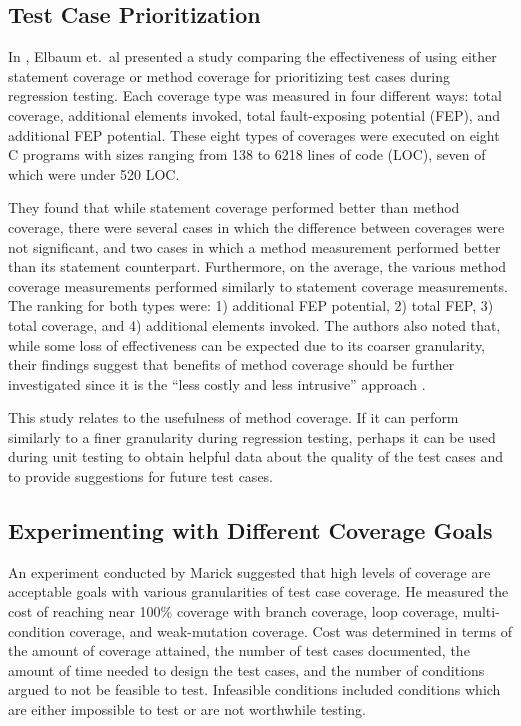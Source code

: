 \subsection{Test Case Prioritization}
In \cite{Elbaum:2002}, Elbaum et.~al presented a study comparing the
effectiveness of using either statement coverage or method coverage for
prioritizing test cases during regression testing.  Each coverage type was
measured in four different ways: total coverage, additional elements
invoked, total fault-exposing potential (FEP), and additional FEP
potential.  These eight types of coverages were executed on eight C
programs with sizes ranging from 138 to 6218 lines of code (LOC), seven of
which were under 520 LOC.

They found that while statement coverage performed better than method
coverage, there were several cases in which the difference between
coverages were not significant, and two cases in which a method measurement
performed better than its statement counterpart.  Furthermore, on the
average, the various method coverage measurements performed similarly to
statement coverage measurements.  The ranking for both types were: 1)
additional FEP potential, 2) total FEP, 3) total coverage, and 4)
additional elements invoked.  The authors also noted that, while some loss
of effectiveness can be expected due to its coarser granularity, their
findings suggest that benefits of method coverage should be further
investigated since it is the ``less costly and less intrusive'' approach
\cite{Elbaum:2002}.

This study relates to the usefulness of method coverage.  If it can perform
similarly to a finer granularity during regression testing, perhaps it can
be used during unit testing to obtain helpful data about the quality of the
test cases and to provide suggestions for future test cases.

\subsection{Experimenting with Different Coverage Goals}
An experiment conducted by Marick \cite{Marick:1991} suggested that high
levels of coverage are acceptable goals with various granularities of test
case coverage.  He measured the cost of reaching near 100\% coverage with
branch coverage, loop coverage, multi-condition coverage, and weak-mutation
coverage.  Cost was determined in terms of the amount of coverage attained,
the number of test cases documented, the amount of time needed to design
the test cases, and the number of conditions argued to not be feasible to
test.  Infeasible conditions included conditions which are either
impossible to test or are not worthwhile testing.

